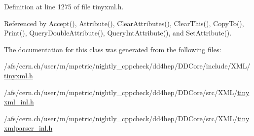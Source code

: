 Definition at line 1275 of file tinyxml.\+h.



Referenced by Accept(), Attribute(), Clear\+Attributes(), Clear\+This(), Copy\+To(), Print(), Query\+Double\+Attribute(), Query\+Int\+Attribute(), and Set\+Attribute().



The documentation for this class was generated from the following files\+:\begin{DoxyCompactItemize}
\item 
/afs/cern.\+ch/user/m/mpetric/nightly\+\_\+cppcheck/dd4hep/\+D\+D\+Core/include/\+X\+M\+L/\hyperlink{tinyxml_8h}{tinyxml.\+h}\item 
/afs/cern.\+ch/user/m/mpetric/nightly\+\_\+cppcheck/dd4hep/\+D\+D\+Core/src/\+X\+M\+L/\hyperlink{tinyxml__inl_8h}{tinyxml\+\_\+inl.\+h}\item 
/afs/cern.\+ch/user/m/mpetric/nightly\+\_\+cppcheck/dd4hep/\+D\+D\+Core/src/\+X\+M\+L/\hyperlink{tinyxmlparser__inl_8h}{tinyxmlparser\+\_\+inl.\+h}\end{DoxyCompactItemize}
